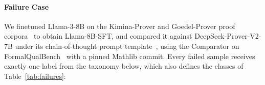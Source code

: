 \documentclass[sigconf,anonymous]{aamas}
\begin{document}
\paragraph{Failure Case}
We finetuned Llama-3-8B on the Kimina-Prover and Goedel-Prover proof
corpora~\citep{kimina_prover_2025, lin2025goedelprover} to obtain Llama-8B-SFT,
and compared it against DeepSeek-Prover-V2-7B under its chain-of-thought prompt
template~\citep{deepseekproverv2}, using the Comparator on
FormalQualBench~\citep{formalqualbench2026} with a pinned Mathlib commit.
Every failed sample receives exactly one label from the taxonomy below, which
also defines the classes of Table~\ref{tab:failures}:
\end{document}
